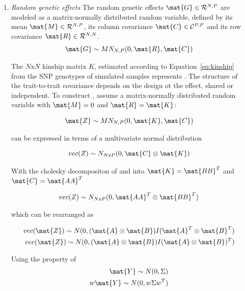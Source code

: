\begin{enumerate}
\item \textit{Random genetic effects} The random genetic effects \(\mat{G} \in \mathcal{R}^{N,P}\) are modeled as a matrix-normally distributed random variable, defined by its mean \(\mat{M} \in \mathcal{R}^{N,P}\), its column covariance \(\mat{C} \in \mathcal{C}^{P,P}\) and its row covariance \(\mat{R} \in \mathcal{R}^{N,N}\).  
\begin{equation}
\mat{G} \sim MN_{N,P}(0,\mat{R},\mat{C}) 
\end{equation}

The \(N \text{x} N\) kinship matrix $K$, estimated according to Equation~\ref{eq:kinship} from the SNP genotypes of simulated samples represents .  The structure of the trait-to-trait covariance  depends on the design ot the effect, shared or independent. To construct , assume a matrix-normally distributed random variable  with \(\mat{M}=0\)  and \(\mat{R} = \mat{K}\):

\begin{equation}
\mat{Z} \sim MN_{N,P}(0,\mat{K},\mat{C}) 
\end{equation}

 can be expressed in terms of a multivariate normal distribution 

\begin{equation}
vec(Z) \sim N_{N\text{x}P}(0, \mat{C} \otimes \mat{K})
\end{equation}

With the cholesky decompositon of  and  into  \(\mat{K}=\mat{BB}^T\) and \(\mat{C}=\mat{AA}^T\) 

\begin{equation}
vec(Z) \sim N_{N\text{x}P}(0, \mat{AA}^T \otimes \mat{BB}^T)
\end{equation}

which can be rearranged  as 

\begin{equation}
\begin{aligned}
vec(\mat{Z}) \sim N(0, (\mat{A} \otimes \mat{B}) I (\mat{A}^T \otimes \mat{B}^T) \\
vec(\mat{Z})  \sim N(0, (\mat{A }\otimes \mat{B}) I (\mat{A} \otimes\mat{B})^T) 
\end{aligned}
\end{equation}

Using the property of 
\begin{equation}
\begin{aligned} 
\mat{Y} \sim N(0, \Sigma) \\
w \mat{Y} \sim N(0, w\Sigma w^T)
\end{aligned}
\end{equation}


\end{enumerate}
